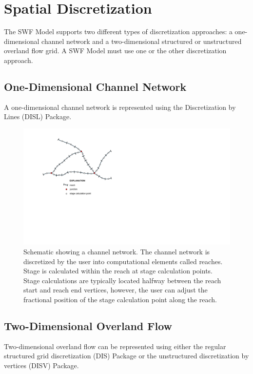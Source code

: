 \documentclass[fleqn]{article}
\begin{document}
\section{Spatial Discretization}
The SWF Model supports two different types of discretization approaches: a one-dimensional channel network and a two-dimensional structured or unstructured overland flow grid.  A SWF Model must use one or the other discretization approach.  

\subsection{One-Dimensional Channel Network}

A one-dimensional channel network is represented using the Discretization by Lines (DISL) Package.  

\begin{figure}
\centering
\includegraphics[scale=0.9]{figures/channel_network.pdf}
\caption[Schematic showing a channel network.]{Schematic showing a channel network.  The channel network is discretized by the user into computational elements called reaches.  Stage is calculated within the reach at stage calculation points.  Stage calculations are typically located halfway between the reach start and reach end vertices, however, the user can adjust the fractional position of the stage calculation point along the reach.}
\label{fig:channel_network}
\end{figure}

\subsection{Two-Dimensional Overland Flow}
Two-dimensional overland flow can be represented using either the regular structured grid discretization (DIS) Package or the unstructured discretization by vertices (DISV) Package.  
\end{document}
